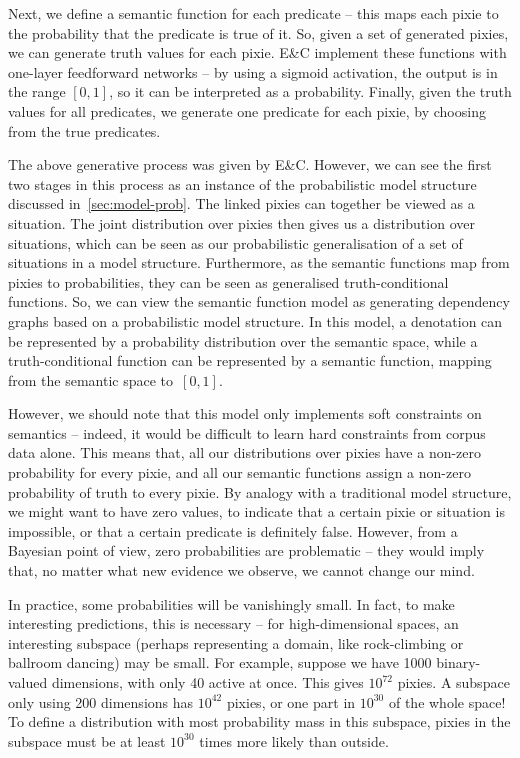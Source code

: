 \documentclass[a4paper,11pt]{article}
\begin{document}
Next, we define a semantic function for each predicate --
this maps each pixie to the probability that the predicate is true of it.
So, given a set of generated pixies,
we can generate truth values for each pixie.
E\&C implement these functions with one-layer feedforward networks --
by using a sigmoid activation, the output is in the range $[0,1]$,
so it can be interpreted as a probability.
Finally, given the truth values for all predicates,
we generate one predicate for each pixie,
by choosing from the true predicates.


The above generative process was given by E\&C.
However, we can see the first two stages in this process
as an instance of the probabilistic model structure discussed in~\cref{sec:model-prob}.
The linked pixies can together be viewed as a situation.
The joint distribution over pixies then gives us a distribution over situations,
which can be seen as our probabilistic generalisation of a set of situations in a model structure.
Furthermore, as the semantic functions map from pixies to probabilities,
they can be seen as generalised truth-conditional functions.
So, we can view the semantic function model
as generating dependency graphs based on a probabilistic model structure.
In this model, a denotation can be represented by
a probability distribution over the semantic space,
while a truth-conditional function can be represented by a semantic function,
mapping from the semantic space to~$[0,1]$.


However, we should note that this model only implements soft constraints on semantics --
indeed, it would be difficult to learn hard constraints from corpus data alone.
This means that, all our distributions over pixies
have a non-zero probability for every pixie,
and all our semantic functions assign a non-zero probability of truth to every pixie.
By analogy with a traditional model structure,
we might want to have zero values, to indicate that a certain pixie or situation is impossible,
or that a certain predicate is definitely false.
However, from a Bayesian point of view, zero probabilities are problematic --
they would imply that, no matter what new evidence we observe,
we cannot change our mind.

In practice, some probabilities will be vanishingly small.
In fact, to make interesting predictions, this is necessary --
for high-dimensional spaces, an interesting subspace
(perhaps representing a domain, like rock-climbing or ballroom dancing)
may be small.
For example, suppose we have 1000 binary-valued dimensions, with only 40 active at once.
This gives $10^{72}$ pixies.
A subspace only using 200 dimensions has $10^{42}$ pixies,
or one part in $10^{30}$ of the whole space!
To define a distribution with most probability mass in this subspace,
pixies in the subspace must be at least $10^{30}$ times more likely than outside.
\end{document}
